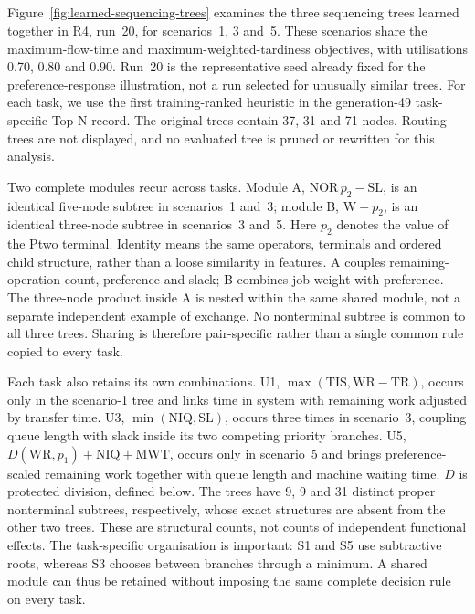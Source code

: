 \subsection{}
\label{sec:learned-tree-structures}
Figure~\ref{fig:learned-sequencing-trees} examines the three sequencing trees learned together in R4, run~20, for scenarios~1, 3 and~5. These scenarios share the maximum-flow-time and maximum-weighted-tardiness objectives, with utilisations 0.70, 0.80 and 0.90. Run~20 is the representative seed already fixed for the preference-response illustration, not a run selected for unusually similar trees. For each task, we use the first training-ranked heuristic in the generation-49 task-specific Top-N record. The original trees contain 37, 31 and 71 nodes. Routing trees are not displayed, and no evaluated tree is pruned or rewritten for this analysis.

Two complete modules recur across tasks. Module A, $\mathrm{NOR}\,p_2-\mathrm{SL}$, is an identical five-node subtree in scenarios~1 and~3; module B, $\mathrm{W}+p_2$, is an identical three-node subtree in scenarios~3 and~5. Here $p_2$ denotes the value of the Ptwo terminal. Identity means the same operators, terminals and ordered child structure, rather than a loose similarity in features. A couples remaining-operation count, preference and slack; B combines job weight with preference. The three-node product inside A is nested within the same shared module, not a separate independent example of exchange. No nonterminal subtree is common to all three trees. Sharing is therefore pair-specific rather than a single common rule copied to every task.

Each task also retains its own combinations. U1, $\max(\mathrm{TIS},\mathrm{WR}-\mathrm{TR})$, occurs only in the scenario-1 tree and links time in system with remaining work adjusted by transfer time. U3, $\min(\mathrm{NIQ},\mathrm{SL})$, occurs three times in scenario~3, coupling queue length with slack inside its two competing priority branches. U5, $D(\mathrm{WR},p_1)+\mathrm{NIQ}+\mathrm{MWT}$, occurs only in scenario~5 and brings preference-scaled remaining work together with queue length and machine waiting time. $D$ is protected division, defined below. The trees have 9, 9 and 31 distinct proper nonterminal subtrees, respectively, whose exact structures are absent from the other two trees. These are structural counts, not counts of independent functional effects. The task-specific organisation is important: S1 and S5 use subtractive roots, whereas S3 chooses between branches through a minimum. A shared module can thus be retained without imposing the same complete decision rule on every task.


